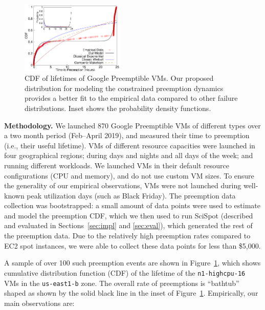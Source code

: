 \documentclass[compsoc]{IEEEtran}
\begin{document}
\begin{figure}
 \centering  \includegraphics[width=0.44\textwidth]{sigmetrics-fig-cdf-prob-inset-time.pdf} 
  \caption{CDF of lifetimes of Google Preemptible VMs. Our proposed distribution for modeling the constrained preemption dynamics provides a better fit to the empirical data compared to other failure distributions. Inset shows the probability density functions.}
  \label{fig:gcp1}
\end{figure}



\noindent \textbf{Methodology.}
We launched  870 Google Preemptible VMs of different types over a two month period (Feb--April 2019), and measured their time to preemption (i.e., their useful lifetime).
VMs of different resource capacities were launched in four geographical regions; during days and nights and all days of the week; and running different workloads. 
We launched VMs in their default resource configurations (CPU and memory), and do not use custom VM sizes.
To ensure the generality of our empirical observations, VMs were not launched during well-known peak utilization days (such as Black Friday).
The preemption data collection was bootstrapped: a small amount of data points were used to estimate and model the preemption CDF, which we then used to run SciSpot (described and evaluated in Sections~\ref{sec:impl} and \ref{sec:eval}), which generated the rest of the preemption data.  
Due to the relatively high preemption rates compared to EC2 spot instances, we were able to collect these data points for less than \$5,000. 


A sample of over 100 such preemption events are shown in Figure~\ref{fig:gcp1}, which shows cumulative distribution function (CDF) of the lifetime of the \texttt{n1-highcpu-16} VMs in the \texttt{us-east1-b} zone. 
The overall rate of preemptions is ``bathtub'' shaped as shown by the solid black line in the inset of Figure~\ref{fig:gcp1}.
Empirically, our main observations are:
\end{document}
